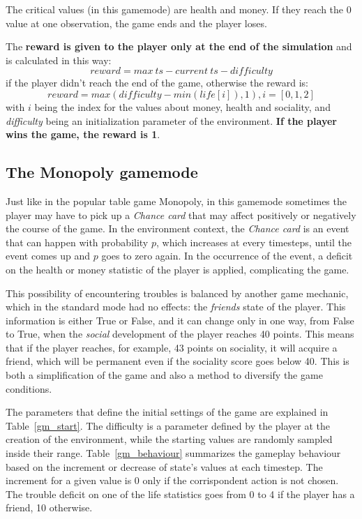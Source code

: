 \documentclass{article}
\begin{document}
The critical values (in this gamemode) are health and money. If they reach the 0 value at one observation, the game ends and the player loses.

The \textbf{reward is given to the player only at the end of the simulation} and is calculated in this way:
\begin{displaymath}
    reward = {max\ ts} - {current\ ts} - {difficulty}
\end{displaymath}
if the player didn't reach the end of the game, otherwise the reward is:
\begin{displaymath}
    reward = max(difficulty - min(life[i]), 1), i=[0,1,2]
\end{displaymath}
with \(i\) being the index for the values about money, health and sociality, and \textit{difficulty} being an initialization parameter of the environment. \textbf{If the player wins the game, the reward is 1}.

\subsection{The Monopoly gamemode}

Just like in the popular table game Monopoly, in this gamemode sometimes the player may have to pick up a \textit{Chance card} that may affect positively or negatively the course of the game. In the environment context, the \textit{Chance card} is an event that can happen with probability \(p\), which increases at every timesteps, until the event comes up and \(p\) goes to zero again. In the occurrence of the event, a deficit on the health or money statistic of the player is applied, complicating the game. 

This possibility of encountering troubles is balanced by another game mechanic, which in the standard mode had no effects: the \textit{friends} state of the player. This information is either True or False, and it can change only in one way, from False to True, when the \textit{social} development of the player reaches 40 points. This means that if the player reaches, for example, 43 points on sociality, it will acquire a friend, which will be permanent even if the sociality score goes below 40. This is both a simplification of the game and also a method to diversify the game conditions.

The parameters that define the initial settings of the game are explained in Table~\ref{gm_start}. The difficulty is a parameter defined by the player at the creation of the environment, while the starting values are randomly sampled inside their range. Table~\ref{gm_behaviour} summarizes the gameplay behaviour based on the increment or decrease of state's values at each timestep. The increment for a given value is \(0\) only if the corrispondent action is not chosen. The trouble deficit on one of the life statistics goes from 0 to 4 if the player has a friend, 10 otherwise.
\end{document}
